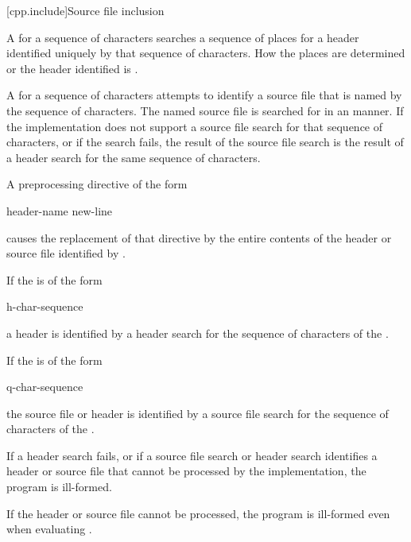 [cpp.include]{Source file inclusion}
%
%

\pnum
A  for a sequence of characters
searches a sequence of places for a header
identified uniquely by that sequence of characters.
How the places are determined or the header identified
is .

\pnum
A  for a sequence of characters
attempts to identify a source file that is named by the sequence of characters.
The named source file is searched for
in an  manner.
If the implementation does not support a source file search
for that sequence of characters, or if the search fails,
the result of the source file search
is the result of a header search for the same sequence of characters.

\pnum
A preprocessing directive of the form
\begin{ncsimplebnf}
 header-name new-line
\end{ncsimplebnf}
causes the replacement of that directive by the entire contents
of the header or source file identified by .

\pnum
If the  is of the form
\begin{ncsimplebnf}
\terminal{<} h-char-sequence \terminal{>}
\end{ncsimplebnf}
a header is identified by a header search for the sequence of characters
of the .

\pnum
If the  is of the form
\begin{ncsimplebnf}
 q-char-sequence 
\end{ncsimplebnf}
the source file or header is identified by a source file search
for the sequence of characters of the .

\pnum
If a header search fails, or if a source file search or header search
identifies a header or source file that cannot be processed by the implementation,
the program is ill-formed.
\begin{note}
If the header or source file cannot be processed,
the program is ill-formed even when evaluating .
\end{note}


